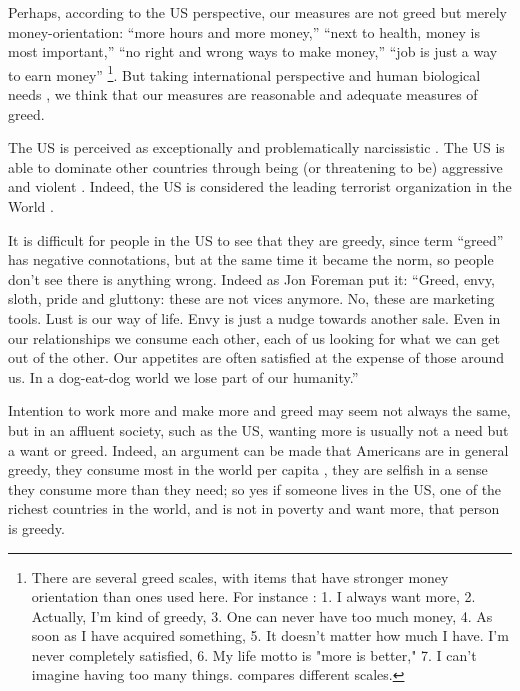 \documentclass[10pt, letterpaper]{article}
\begin{document}
\begin{spacing}{1.8}
Perhaps, according to the US perspective, our measures are not greed but merely
money-orientation: ``more hours and more money,'' ``next to health, money is
most important,'' ``no right and wrong ways to make money,'' ``job is just a way
to earn money'' \footnote{There are several greed scales, with items that have
  stronger money orientation than ones used here. For instance
  \citet{seuntjens15}: 1. I always want more, 2. Actually, I'm kind of greedy,
  3. One can never have too much money, 4. As soon as I have acquired something,
  5. It doesn't matter how much I have. I'm never completely satisfied, 6. My
  life motto is "more is better," 7. I can't imagine having too many things. \citet{mussel18} compares different scales.  %
}. But taking international perspective and human
biological needs  \citep[as per ][]{veenhoven14b}, we think that our measures
are reasonable and adequate measures of greed.

The US is perceived as exceptionally and problematically narcissistic \citep{miller15}.
The US %
is able to dominate other countries through being (or threatening to be) aggressive and violent \citep[e.g.,][]{pratto08}. %
 Indeed, the US is considered the leading terrorist organization in the World
 \citep{truthout14nov3}. 

It is difficult for people in the US to see that they are greedy, since term ``greed''
has negative connotations, but at the same time it became the norm, so people
don't see there is anything wrong. Indeed as Jon Foreman put it:
``Greed, envy, sloth, pride and gluttony: these are not vices anymore. No, these are marketing tools. Lust is our way of life. Envy is just a nudge towards another sale. Even in our relationships we consume each other, each of us looking for what we can get out of the other. Our appetites are often satisfied at the expense of those around us. In a dog-eat-dog world we lose part of our humanity.''



Intention to work more and make more and greed may seem not always the same, 
but in an affluent society, such as the US, wanting more is usually not a need
but a want or greed. Indeed, an argument can be made that Americans are in general greedy, they consume most in the world per capita \citep{leonard10,kasser13}, they are selfish in a sense they consume more than they need; so yes if someone lives in the US, one of the richest countries in the world, and is not in poverty and want more, that person is greedy.



\end{spacing}
\end{document}
